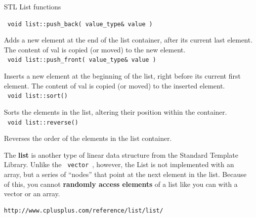 \documentclass[a4paper,12pt]{book}
\begin{document}
                \begin{intro}{STL List functions}

                    \footnotesize
                    
                    \texttt{ void list::push\_back( value\_type\&  value ) }

                        Adds a new element at the end of the list container, after its current last element.
                        The content of val is copied (or moved) to the new element. \\
                    
                    \texttt{ void list::push\_front( value\_type\&  value ) }

                        Inserts a new element at the beginning of the list, right before its current first element.
                        The content of val is copied (or moved) to the inserted element. \\
                    
                    \texttt{ void list::sort() }

                        Sorts the elements in the list, altering their position within the container. \\
                    
                    \texttt{ void list::reverse() }

                        Reverses the order of the elements in the list container. \\
                    

                    
                \end{intro}




            
                The \textbf{ list } is another type of linear data
                structure from the Standard Template Library. Unlike
                the \texttt{ vector }, however, the List is not implemented
                with an array, but a series of ``nodes'' that point at the
                next element in the list. Because of this, you cannot
                \textbf{ randomly access elements } of a list like you can
                with a vector or an array.
\begin{verbatim}
http://www.cplusplus.com/reference/list/list/
\end{verbatim}
\end{document}
